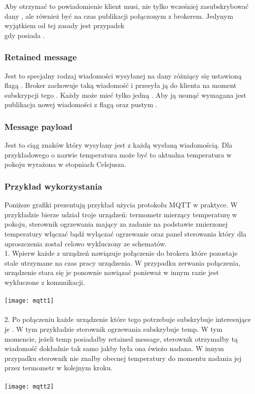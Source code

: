 Aby otrzymać to powiadomienie klient musi, nie tylko wcześniej zasubskrybować dany , ale również być na czas publikacji połączonym z brokerem. Jedynym wyjątkiem od tej zasady jest przypadek\\gdy {} posiada .

\subsubsection{Retained message}
Jest to specjalny rodzaj wiadomości wysyłanej na dany  różniący się ustawioną flagą . Broker zachowuje taką wiadomość i przesyła ją do klienta na moment subskrypcji tego . Każdy  może mieć tylko jedną . Aby ją usunąć wymagana jest publikacja nowej wiadomości z flagą  oraz pustym .

\subsubsection{Message payload}
Jest to ciąg znaków który wysyłany jest z każdą wysłaną wiadomością. Dla przykładowego  o nazwie temperatura może być to aktualna temperatura w pokoju wyrażona w stopniach Celsjusza.

\newpage

\subsubsection{Przykład wykorzystania}
Poniższe grafiki prezentują przykład użycia protokołu MQTT w praktyce. W przykładzie bierze udział troje urządzeń: termometr mierzący temperaturę w pokoju, sterownik ogrzewania mający za zadanie na podstawie zmierzonej temperatury włączać bądź wyłączać ogrzewanie oraz panel sterowania który dla uproszczenia został celowo wykluczony ze schematów.\\

1. Wpierw każde z urządzeń nawiązuje połączenie do brokera które pozostaje stale utrzymane na czas pracy urządzenia. W przypadku zerwania połączenia, urządzenie stara się je ponownie nawiązać ponieważ w innym razie jest wykluczone z komunikacji.\\\\
\texttt{[image: mqtt1]}\\\\

2. Po połączeniu każde urządzenie które tego potrzebuje subskrybuje interesujące je . W tym przykładzie sterownik ogrzewania subskrybuje  temp. W tym momencie, jeżeli  temp posiadałby retained message, sterownik otrzymałby tą wiadomość dokładnie tak samo jakby była ona świeżo nadana. W innym przypadku sterownik nie znałby obecnej temperatury do momentu nadania jej przez termometr w kolejnym kroku.\\\\
\texttt{[image: mqtt2]}\\\\

